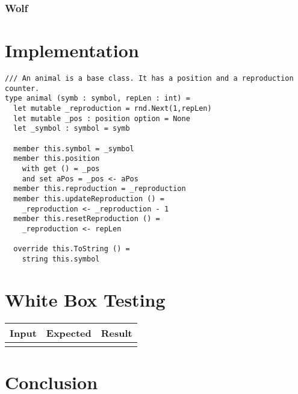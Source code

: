 \documentclass{article}
\begin{document}
    \subsubsection{Wolf}    

    \section{Implementation}
		\lstset{language=FSharp}

		\begin{lstlisting}
/// An animal is a base class. It has a position and a reproduction counter.
type animal (symb : symbol, repLen : int) =
  let mutable _reproduction = rnd.Next(1,repLen)
  let mutable _pos : position option = None
  let _symbol : symbol = symb

  member this.symbol = _symbol
  member this.position
    with get () = _pos
    and set aPos = _pos <- aPos
  member this.reproduction = _reproduction
  member this.updateReproduction () =
    _reproduction <- _reproduction - 1
  member this.resetReproduction () =
    _reproduction <- repLen

  override this.ToString () =
    string this.symbol
		\end{lstlisting}
		
         
    \section{White Box Testing}
   	   \begin{tabular}{|c|c|c|}
   	   		\hline
   	   		Input & Expected & Result\\
   	   		\hline
   	   		&&\\
   	   		\hline
   	   \end{tabular}
    \section{Conclusion}
     
\end{document}
